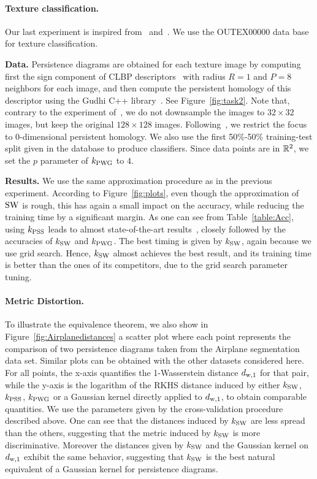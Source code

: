 \paragraph*{Texture classification.}
Our last experiment is inspired from~\cite{Reininghaus15} and~\cite{Li14}. 
We use the OUTEX00000 data base~\cite{Ojala02} for texture classification. 

{\bf Data.} Persistence diagrams are obtained for each texture image by computing first the sign component of CLBP descriptors~\cite{Guo10} 
with radius $R=1$ and $P=8$ neighbors for each image,
and then compute the persistent homology of this descriptor using the Gudhi C++ library~\cite{gudhi:CubicalComplex}. 
See Figure~\ref{fig:task2}.
Note that, contrary to the experiment of~\cite{Reininghaus15}, we do not downsample the images to $32\times 32$ images,
but keep the original $128\times128$ images. 
Following~\cite{Reininghaus15}, we restrict the focus to 0-dimensional persistent homology.
We also use the first 50\%-50\% training-test split given in the database to produce classifiers. 
Since data points are in $\mathbb{R}^2$, we set the $p$ parameter of $k_{\rm PWG}$ to $4$. 

{\bf Results.} We use the same approximation procedure as in the previous experiment.
According to Figure~\ref{fig:plots}, even though the approximation of ${\rm SW}$ is rough,
this has again a small impact on the accuracy, while reducing the training time by a significant margin.
As one can see from Table~\ref{table:Acc}, 
using $k_{\rm PSS}$ leads to almost state-of-the-art results~\cite{Ojala02, Guo10},
closely followed by the accuracies of $k_{\rm SW}$ and $k_{\rm PWG}$.
The best timing is given by $k_{\rm SW}$, again because we use grid search. 
Hence, $k_{\rm SW}$ almost achieves the best result, and its training time is
better than the ones of its competitors, due to the grid search parameter tuning.




\paragraph*{Metric Distortion.} 
To illustrate the equivalence theorem, we also show in Figure~\ref{fig:Airplanedistances} 
a scatter plot where each point represents the comparison of two persistence diagrams taken from the Airplane segmentation data set. 
Similar plots can be obtained with the other datasets considered here.
For all points, the x-axis quantifies the 1-Wasserstein distance $d_{{\rm w},1}$ for that pair,
while the y-axis is the logarithm of the RKHS distance induced by either $k_{\rm SW}$, $k_{\rm PSS}$, $k_{\rm PWG}$ 
or a Gaussian kernel directly applied to $d_{{\rm w},1}$, to obtain comparable quantities. 
We use the parameters given by the cross-validation procedure described above.
One can see that the distances induced by $k_{\rm SW}$ are less spread than the others,
suggesting that the metric induced by $k_{\rm SW}$ is more discriminative.
Moreover the distances given by $k_{\rm SW}$ and the Gaussian kernel on $d_{{\rm w},1}$ exhibit the same behavior, 
suggesting that $k_{\rm SW}$ is the best natural equivalent of a Gaussian kernel for persistence diagrams. 

